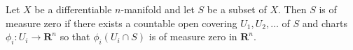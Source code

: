 Let $X$ be a differentiable $n$-manifold and let $S$ be a subset of $X$. Then $S$ is of measure zero if there exists a countable open covering $U_1, U_2, \ldots$ of $S$ and charts $\phi_i : U_i \rightarrow \mathbf{R}^n$ so that $\phi_i(U_i \cap S)$ is of measure zero in $\mathbf{R}^n$.
